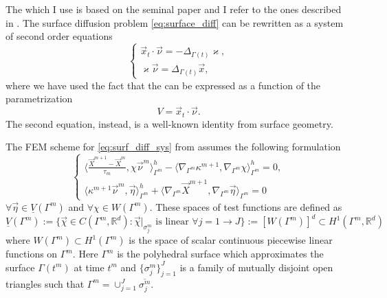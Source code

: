 The  which I use is based on the seminal paper
\cite{Dziuk91} and I refer to the ones described in
\cite{triplej,triplejMC,gflows3d}. The surface diffusion problem
\eqref{eq:surface_diff} can be rewritten as a system of second order equations
\begin{equation}\label{eq:surf_diff_sys}
 \begin{cases}
  \vec{x}_t\cdot\vec{\nu}=-\Delta_{\Gamma(t)} \varkappa,\\
  \varkappa\vec{\nu}=\Delta_{\Gamma(t)}\vec{x},
 \end{cases}
\end{equation}
where we have used the fact that the  can be expressed as a
function of the parametrization
\begin{equation}
 V=\vec{x}_t\cdot\vec{\nu}.
\end{equation}
The second equation, instead, is a well-known identity from surface geometry.
\newline

The FEM scheme for \eqref{eq:surf_diff_sys} from \cite{gflows3d} assumes the
following formulation
\begin{equation}\label{eq:fem_surf_diff}
 \begin{cases}
  \langle \frac{\vec{X}^{m + 1} - \vec{X}^{m}}{\tau_m},
  \chi\vec{\nu}^m\rangle_{\Gamma^m}^{h} - \langle\nabla_{
  \Gamma^m}\kappa^{m+1}, \nabla_{\Gamma^m}\chi \rangle_{\Gamma^m}^{h} = 0,\\
  \langle\kappa^{m+1}\vec{\nu}^m,
  \vec{\eta}\rangle_{\Gamma^m}^{h} + \langle\nabla_{\Gamma^m}\vec{X}^{m + 1},
  \nabla_{\Gamma^m}\vec{\eta} \rangle_{\Gamma^m}=0
 \end{cases}
\end{equation}
$\forall\vec{\eta}\in\underline{V}(\Gamma^m)$ and $\forall\chi\in W(\Gamma^m)$.
These spaces of test functions are defined as
\begin{equation}\label{eq:space_test_functions}
 \underline{V}(\Gamma^m) := \{\vec{\chi}\in C(\Gamma^m,\mathbb{R}^d) :
\vec{\chi}|_{\sigma_j^m}\textrm{ is linear }\forall j=1\rightarrow J\} :=
[W(\Gamma^m)]^d\subset H^1(\Gamma^m,\mathbb{R}^d)
\end{equation}
where $W(\Gamma^m)\subset H^1(\Gamma^m)$ is the space of scalar continuous
piecewise linear functions on $\Gamma^m$. Here $\Gamma^m$ is the polyhedral
surface which approximates the surface $\Gamma (t^m)$ at time $t^m$ and
$\{\sigma_j^m\}_{j=1}^J$ is a family of mutually disjoint open triangles such
that $\Gamma^m=\cup_{j=1}^J\overline{\sigma_j^m}$.
\newline

